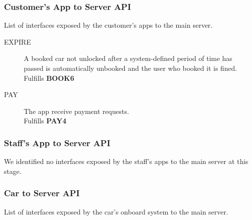 \documentclass[11pt]{article} %
\begin{document}
\begin{description}
\subsubsection{Customer's App to Server API}
List of interfaces exposed by the customer's apps to the main server.
\begin{description}
	\item[EXPIRE] A booked car not unlocked after a system-defined period of time has passed is automatically unbooked and the user who booked it is fined. \\ Fulfills \textbf{BOOK6}
	\item[PAY] The app receive payment requests. \\ Fulfills \textbf{PAY4}
\end{description}


\subsubsection{Staff's App to Server API}
We identified no interfaces exposed by the staff's apps to the main server at this stage.


\subsubsection{Car to Server API}
List of interfaces exposed by the car's onboard system to the main server.


\end{description}
\end{document}
